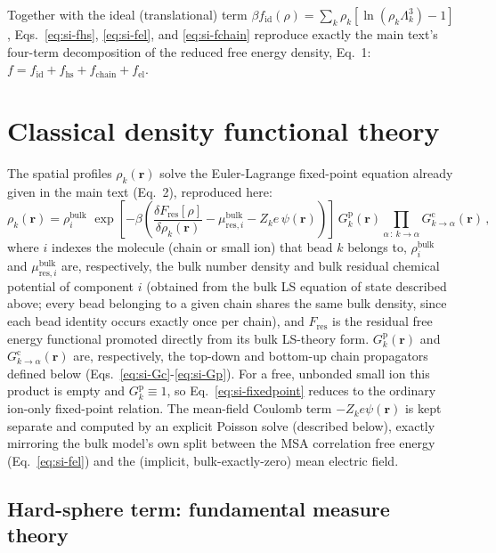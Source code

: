 \documentclass[journal=macl,manuscript=suppinfo,layout=onecolumn]{achemso}
\begin{document}
Together with the ideal (translational) term $\beta f_\mathrm{id}(\rho)=\sum_k\rho_k[\ln(\rho_k\Lambda_k^3)-1]$, Eqs.~\ref{eq:si-fhs}, \ref{eq:si-fel}, and \ref{eq:si-fchain} reproduce exactly the main text's four-term decomposition of the reduced free energy density, Eq.~1: $f=f_\mathrm{id}+f_\mathrm{hs}+f_\mathrm{chain}+f_\mathrm{el}$.

\section{Classical density functional theory}
\label{si:dft}

The spatial profiles $\rho_k(\mathbf{r})$ solve the Euler-Lagrange fixed-point equation already given in the main text (Eq.~2), reproduced here:
\begin{equation}
    \rho_k(\mathbf{r}) = \rho_i^\mathrm{bulk}\,\,\exp\!\left[-\beta\left(\frac{\delta F_\mathrm{res}[\rho]}{\delta\rho_k(\mathbf{r})} - \mu_{\mathrm{res},i}^\mathrm{bulk} - Z_k e\,\psi(\mathbf{r})\right)\right]\,G_k^\mathrm{p}(\mathbf{r})\!\!\prod_{\alpha\,:\,k\to\alpha}\!\! G_{k\to\alpha}^\mathrm{c}(\mathbf{r})\,,
    \label{eq:si-fixedpoint}
\end{equation}
where $i$ indexes the molecule (chain or small ion) that bead $k$ belongs to, $\rho_i^\mathrm{bulk}$ and $\mu_{\mathrm{res},i}^\mathrm{bulk}$ are, respectively, the bulk number density and bulk residual chemical potential of component $i$ (obtained from the bulk LS equation of state described above; every bead belonging to a given chain shares the same bulk density, since each bead identity occurs exactly once per chain), and $F_\mathrm{res}$ is the residual free energy functional promoted directly from its bulk LS-theory form. $G_k^\mathrm{p}(\mathbf{r})$ and $G_{k\to\alpha}^\mathrm{c}(\mathbf{r})$ are, respectively, the top-down and bottom-up chain propagators defined below (Eqs.~\ref{eq:si-Gc}-\ref{eq:si-Gp}). For a free, unbonded small ion this product is empty and $G_k^\mathrm{p}\equiv1$, so Eq.~\ref{eq:si-fixedpoint} reduces to the ordinary ion-only fixed-point relation. The mean-field Coulomb term $-Z_ke\psi(\mathbf{r})$ is kept separate and computed by an explicit Poisson solve (described below), exactly mirroring the bulk model's own split between the MSA correlation free energy (Eq.~\ref{eq:si-fel}) and the (implicit, bulk-exactly-zero) mean electric field.

\subsection{Hard-sphere term: fundamental measure theory}
\label{si:fmt}
\end{document}
